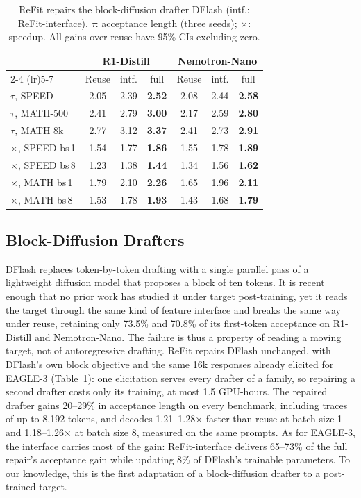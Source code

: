 \documentclass[11pt]{article}
\newcommand{\refit}{ReFit}
\newcommand{\refitI}{ReFit-interface}
\begin{document}
\begin{table}[t]
  \centering
  \small
  \setlength{\tabcolsep}{3.3pt}
  \begin{tabular}{@{}lcccccc@{}}
    \toprule
    & \multicolumn{3}{c}{R1-Distill} & \multicolumn{3}{c}{Nemotron-Nano} \\
    \cmidrule(lr){2-4} \cmidrule(lr){5-7}
    & Reuse & intf. & full & Reuse & intf. & full \\
    \midrule
    $\tau$, SPEED & 2.05 & 2.39 & \textbf{2.52} & 2.08 & 2.44 & \textbf{2.58} \\
    $\tau$, MATH-500 & 2.41 & 2.79 & \textbf{3.00} & 2.17 & 2.59 & \textbf{2.80} \\
    $\tau$, MATH 8k & 2.77 & 3.12 & \textbf{3.37} & 2.41 & 2.73 & \textbf{2.91} \\
    \midrule
    $\times$, SPEED bs\,1 & 1.54 & 1.77 & \textbf{1.86} & 1.55 & 1.78 & \textbf{1.89} \\
    $\times$, SPEED bs\,8 & 1.23 & 1.38 & \textbf{1.44} & 1.34 & 1.56 & \textbf{1.62} \\
    $\times$, MATH bs\,1 & 1.79 & 2.10 & \textbf{2.26} & 1.65 & 1.96 & \textbf{2.11} \\
    $\times$, MATH bs\,8 & 1.53 & 1.78 & \textbf{1.93} & 1.43 & 1.68 & \textbf{1.79} \\
    \bottomrule
  \end{tabular}
  \caption{\refit{} repairs the block-diffusion drafter DFlash (intf.: \refitI{}). $\tau$: acceptance length (three seeds); $\times$: speedup. All gains over reuse have 95\% CIs excluding zero.}
  \label{tab:dflash}
\end{table}

\subsection{Block-Diffusion Drafters}
\label{sec:dflash}

DFlash \citep{chen2026dflash} replaces token-by-token drafting with a single parallel pass of a lightweight diffusion model that proposes a block of ten tokens.
It is recent enough that no prior work has studied it under target post-training, yet it reads the target through the same kind of feature interface and breaks the same way under reuse, retaining only 73.5\% and 70.8\% of its first-token acceptance on R1-Distill and Nemotron-Nano.
The failure is thus a property of reading a moving target, not of autoregressive drafting.
\refit{} repairs DFlash unchanged, with DFlash's own block objective and the same 16k responses already elicited for EAGLE-3 (Table~\ref{tab:dflash}): one elicitation serves every drafter of a family, so repairing a second drafter costs only its training, at most 1.5 GPU-hours.
The repaired drafter gains 20--29\% in acceptance length on every benchmark, including traces of up to 8,192 tokens, and decodes 1.21--1.28$\times$ faster than reuse at batch size 1 and 1.18--1.26$\times$ at batch size 8, measured on the same prompts.
As for EAGLE-3, the interface carries most of the gain: \refitI{} delivers 65--73\% of the full repair's acceptance gain while updating 8\% of DFlash's trainable parameters.
To our knowledge, this is the first adaptation of a block-diffusion drafter to a post-trained target.
\end{document}
